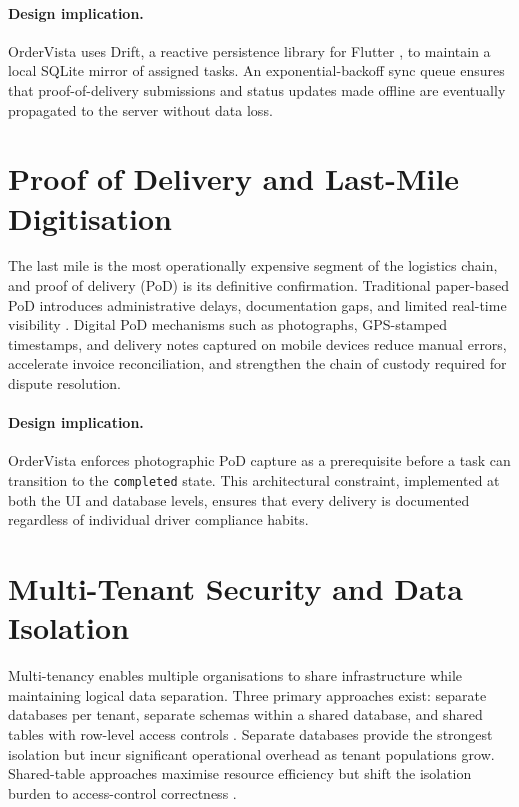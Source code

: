 \paragraph{Design implication.}
OrderVista uses Drift, a reactive persistence library for Flutter \autocite{drift2026docs}, to maintain a local SQLite mirror of assigned tasks. An exponential-backoff sync queue ensures that proof-of-delivery submissions and status updates made offline are eventually propagated to the server without data loss.

\section{Proof of Delivery and Last-Mile Digitisation}
\label{sec:lit-pod}

The last mile is the most operationally expensive segment of the logistics chain, and proof of delivery (PoD) is its definitive confirmation. Traditional paper-based PoD introduces administrative delays, documentation gaps, and limited real-time visibility \autocite{bhattacharjee2024digitizing}. Digital PoD mechanisms such as photographs, GPS-stamped timestamps, and delivery notes captured on mobile devices reduce manual errors, accelerate invoice reconciliation, and strengthen the chain of custody required for dispute resolution.

\paragraph{Design implication.}
OrderVista enforces photographic PoD capture as a prerequisite before a task can transition to the \texttt{completed} state. This architectural constraint, implemented at both the UI and database levels, ensures that every delivery is documented regardless of individual driver compliance habits.

\section{Multi-Tenant Security and Data Isolation}
\label{sec:lit-rls}

Multi-tenancy enables multiple organisations to share infrastructure while maintaining logical data separation. Three primary approaches exist: separate databases per tenant, separate schemas within a shared database, and shared tables with row-level access controls \autocite{abdul2018multitenant,gao2011nonintrusive}. Separate databases provide the strongest isolation but incur significant operational overhead as tenant populations grow. Shared-table approaches maximise resource efficiency but shift the isolation burden to access-control correctness \autocite{gao2011nonintrusive}.

